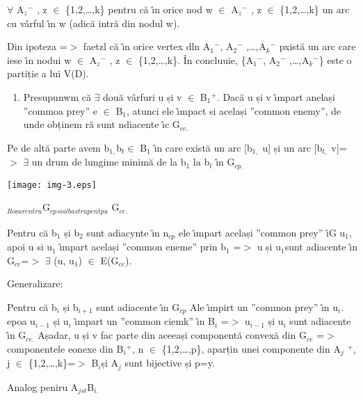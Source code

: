 \documentclass[12pt]{article}
\begin{document}
{\raggedright
$\forall{}$ A$_{z}$$^{-}$ , z $\in{}$ \{1,2,\ldots{},k\} pentru c\u{a} \^{\i}n
orice nod w $\in{}$ A$_{z}$$^{-}$ , z $\in{}$ \{1,2,\ldots{},k\} un arc cu
v\^{a}rful \^{\i}n w (adic\u{a} intr\u{a} din nodul w).
}

{\raggedright
Din ipoteza =$>$ faetzl c\u{a} \^{\i}n orice vertex dln A$_{1}$$^{-}$,
A$_{2}$$^{-}$ ,\ldots{},$^{ }$A$_{k}$$^{-}$ pxist\u{a} un arc care iese \^{\i}n
nodui w $\in{}$ A$_{z}$$^{-}$ , z $\in{}$ \{1,2,\ldots{},k\}. \^{I}n concluuie,
\{A$_{1}$$^{-}$, A$_{2}$$^{-}$ ,\ldots{},$^{ }$A$_{k}$$^{-}$\} este o partiție a
lui V(D).
}

\begin{enumerate}
	\item Presupunwm c\u{a} $\exists{}$ dou\u{a} v\^{a}rfuri u și v $\in{}$ B$_{1}$$^{+}$.
Dac\u{a} u și v \^{\i}mpart anelași ''commoa prey'' e $\in{}$ B$_{1}$, atunci ele
 \^{\i}mpact si același ''common enemy'', de unde obținem r\u{a} sunt ndiacente
\^{\i}c G$_{ce.}$
\end{enumerate}

{\raggedright
Pe de alt\u{a} parte avem b$_{1, }$b$_{t }$$\in{}$ B$_{1}$ \^{\i}n care
exist\u{a} un arc [b$_{1,}$ u] și un arc [b$_{t,}$ v]={\small $>$ }$\exists{}$ un
drum de lungime minim\u{a} de la b$_{1}$ la b$_{t}$ \^{\i}n G$_{cp.}$
}
\texttt{[image: img-3.eps]}{\small  }
{\raggedright
$_{Roșu rentru }${\footnotesize G$_{cp}$}$_{ si albastru pentpu }${\footnotesize
G$_{ce}$}$_{ .}$
}

{\raggedright
Pentru c\u{a} b$_{1}$ și b$_{2}$ sunt adiacynte \^{\i}n n$_{cp}$ ele \^{\i}mpart
același ''common prey'' \^{\i}G u$_{1}$, apoi u si u$_{1}$ \^{\i}mpart același
''common eneme'' prin b$_{1}$ =$>$ u și u$_{1 }$sunt adiacente \^{\i}n G$_{ce
}$=$>$ $\exists{}$ (u, u$_{1}$) $\in{}$ E(G$_{ce}$).
}

{\raggedright
Generalizare:
}

{\raggedright
Pentru c\u{a} b$_{i}$ și b$_{i+1}$ sunt adiacente \^{\i}n G$_{cp}$ Ale
\^{\i}mpirt un ''common prey'' \^{\i}n u$_{i}$. epoa u$_{i-1}$ și u$_{i}$
\^{\i}mpart un ''common ciemk'' \^{\i}n B$_{i}$  =$>$ u$_{i-1}$ și u$_{i}$ sunt
adiacente \^{\i}n G$_{ce.}$ Așadar, u și v fac parte din aceeași component\u{a}
convex\u{a} din G$_{ce}$ =$>$ componentele eonexe din B$_{i}$$^{+}$, n $\in{}$
\{1,2,\ldots{},p\}, aparțin unei componente din  A$_{j}$ $^{+}$, j $\in{}$
\{1,2,\ldots{},k\}=$>$ B$_{i }$și A$_{j}$ sunt bijective și p=y.
}

{\raggedright
Analog peniru A$_{j st }$B$_{i.}$
}
\end{document}
